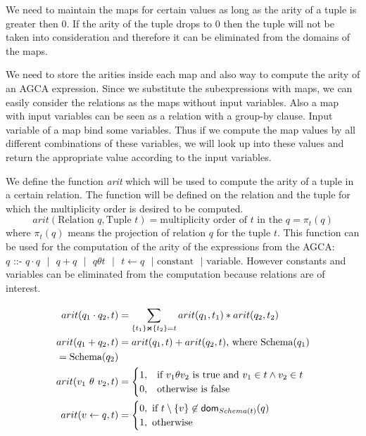 \documentclass[12pt]{article}
\begin{document}
We need to maintain the maps for certain values as long as the arity of a tuple is greater then 0. If the arity  of the tuple drops to 0 then the tuple will not be taken into consideration and therefore it can be eliminated from the domains of the maps.

We need to store the arities inside each map and also way to compute the arity of an AGCA expression. Since we substitute the subexpressions with maps, we can easily consider the relations as the maps without input variables. Also a map with input variables can be seen as a relation with a group-by clause. Input variable of a map bind some variables. Thus if we compute the map values by all different combinations of these variables, we will look up into these values and return the appropriate value according to the input variables.  

We define the function \emph{arit} which will be used to compute the arity of a tuple in a certain relation. The function will be defined on the relation and the tuple for which the multiplicity order is desired to be computed. $$arit(\text{Relation } q,\text{Tuple } t)=\text{multiplicity order of }t\text{ in the } q =\pi_{t}(q)$$ where $\pi_{t}(q)$ means the projection of relation $q$ for the tuple $t$. This function can be used for the computation of the arity of the expressions from the AGCA: $q\text{ ::- }q\cdot q\text{ }|\text{ }q+q\text{ }|\text{ }q \theta t\text{ }|\text{ }t\gets q\text{ }|\text{ constant}\text{ }|\text{ variable}$. However constants and variables can be eliminated from the computation because relations are of interest.

\begin{align}
arit(q_{1}\cdot q_{2},t)&=\sum\limits_{\{t_{1}\}\Join \{t_{2}\}={t}}^{}arit(q_{1},t_{1})*arit(q_{2},t_{2})\\
arit(q_{1} + q_{2},t)&=arit(q_{1},t)+arit(q_{2},t)\text{, where Schema}(q_{1})\\=\text{Schema}(q_{2})\\
arit(v_1\text{ } \theta \text{ } v_2,t)&=\begin{cases}1,& \mbox{if } v_1\theta v_2 \mbox{ is true and }v_{1}\in t \land v_{2}\in t\\
0,& \text{otherwise} \mbox{ is false} 
\end{cases}\\
arit(v\gets q,t)&=\begin{cases}0, \mbox{ if $t\setminus\{v\}\not\in \text{\textsf{dom}}_{Schema(t)}(q)$}\\ 1, \mbox{ otherwise} \end{cases}
\end{align}
\end{document}

